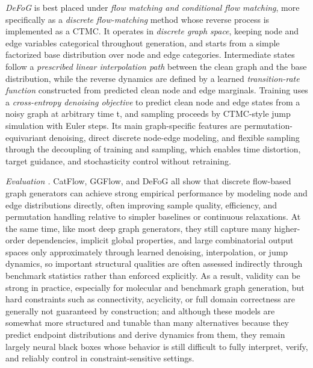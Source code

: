 \documentclass{article}
\begin{document}
\emph{DeFoG} \cite{qin2025defog} is best placed under \emph{flow matching and conditional flow matching}, more specifically as a \emph{discrete flow-matching} method whose reverse process is implemented as a CTMC. It operates in \emph{discrete graph space}, keeping node and edge variables categorical throughout generation, and starts from a simple factorized base distribution over node and edge categories. Intermediate states follow a \emph{prescribed linear interpolation path} between the clean graph and the base distribution, while the reverse dynamics are defined by a learned \emph{transition-rate function} constructed from predicted clean node and edge marginals. Training uses a \emph{cross-entropy denoising objective} to predict clean node and edge states from a noisy graph at arbitrary time t, and sampling proceeds by CTMC-style jump simulation with Euler steps. Its main graph-specific features are permutation-equivariant denoising, direct discrete node-edge modeling, and flexible sampling through the decoupling of training and sampling, which enables time distortion, target guidance, and stochasticity control without retraining.


\emph{Evaluation .} CatFlow, GGFlow, and DeFoG all show that discrete flow-based graph generators can achieve strong empirical performance by modeling node and edge distributions directly, often improving sample quality, efficiency, and permutation handling relative to simpler baselines or continuous relaxations. At the same time, like most deep graph generators, they still capture many higher-order dependencies, implicit global properties, and large combinatorial output spaces only approximately through learned denoising, interpolation, or jump dynamics, so important structural qualities are often assessed indirectly through benchmark statistics rather than enforced explicitly. As a result, validity can be strong in practice, especially for molecular and benchmark graph generation, but hard constraints such as connectivity, acyclicity, or full domain correctness are generally not guaranteed by construction; and although these models are somewhat more structured and tunable than many alternatives because they predict endpoint distributions and derive dynamics from them, they remain largely neural black boxes whose behavior is still difficult to fully interpret, verify, and reliably control in constraint-sensitive settings.
\end{document}
